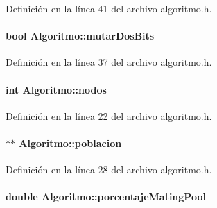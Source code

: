 Definición en la línea 41 del archivo algoritmo.\-h.

\hypertarget{class_algoritmo_a128d4c2bd8d16eb3cb94f29f75ce33de}{
\paragraph[{mutar\-Dos\-Bits}]{\setlength{\rightskip}{0pt plus 5cm}bool Algoritmo\-::mutar\-Dos\-Bits\hspace{0.3cm}{\ttfamily [private]}}}\label{class_algoritmo_a128d4c2bd8d16eb3cb94f29f75ce33de}


Definición en la línea 37 del archivo algoritmo.\-h.

\hypertarget{class_algoritmo_a8b600a2b305e168f34896450a86330de}{
\paragraph[{nodos}]{\setlength{\rightskip}{0pt plus 5cm}int Algoritmo\-::nodos\hspace{0.3cm}{\ttfamily [private]}}}\label{class_algoritmo_a8b600a2b305e168f34896450a86330de}


Definición en la línea 22 del archivo algoritmo.\-h.

\hypertarget{class_algoritmo_a5f6b839180abb11469b6e33cf2dd2871}{
\paragraph[{poblacion}]{$\ast$$\ast$ Algoritmo\-::poblacion\hspace{0.3cm}{\ttfamily [private]}}}\label{class_algoritmo_a5f6b839180abb11469b6e33cf2dd2871}


Definición en la línea 28 del archivo algoritmo.\-h.

\hypertarget{class_algoritmo_a8423d3ea20137a281055f4b04f1d5492}{
\paragraph[{porcentaje\-Mating\-Pool}]{\setlength{\rightskip}{0pt plus 5cm}double Algoritmo\-::porcentaje\-Mating\-Pool\hspace{0.3cm}{\ttfamily [private]}}}\label{class_algoritmo_a8423d3ea20137a281055f4b04f1d5492}


